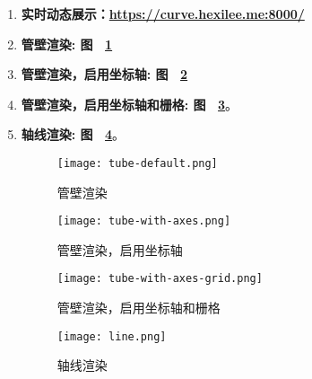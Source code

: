 
\begin{enumerate}

\item \textbf{实时动态展示：\href{https://curve.hexilee.me:8000/}{https://curve.hexilee.me:8000/}}

\item \textbf{管壁渲染: 图 ~\ref{fig:tube-default}}

\item \textbf{管壁渲染，启用坐标轴: 图 ~\ref{fig:tube-with-axes}}

\item \textbf{管壁渲染，启用坐标轴和栅格: 图 ~\ref{fig:tube-with-axes-grid}}。

\item \textbf{轴线渲染: 图 ~\ref{fig:line}}。

\begin{figure}[H]
\centering
\texttt{[image: tube-default.png]}
\caption{管壁渲染}
\label{fig:tube-default}
\end{figure}

\begin{figure}[H]
\centering
\texttt{[image: tube-with-axes.png]}
\caption{管壁渲染，启用坐标轴}
\label{fig:tube-with-axes}
\end{figure}

\begin{figure}[H]
\centering
\texttt{[image: tube-with-axes-grid.png]}
\caption{管壁渲染，启用坐标轴和栅格}
\label{fig:tube-with-axes-grid}
\end{figure}

\begin{figure}[H]
\centering
\texttt{[image: line.png]}
\caption{轴线渲染}
\label{fig:line}
\end{figure}

\end{enumerate}